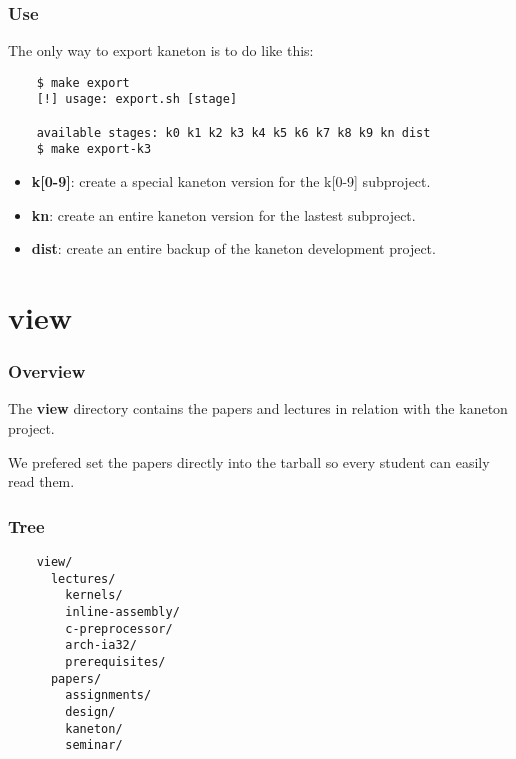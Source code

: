 \begin{frame}[containsverbatim]
  \frametitle{Use}

  The only way to export kaneton is to do like this:

  \begin{verbatim}
    $ make export
    [!] usage: export.sh [stage]

    available stages: k0 k1 k2 k3 k4 k5 k6 k7 k8 k9 kn dist
    $ make export-k3
  \end{verbatim}

  \begin{itemize}
    \item
      \textbf{k[0-9]}: create a special kaneton version for the k[0-9]
      subproject.
    \item
      \textbf{kn}: create an entire kaneton version for the lastest
      subproject.
    \item
      \textbf{dist}: create an entire backup of the kaneton development
      project.
  \end{itemize}
\end{frame}

%
%

\section{view}


\begin{frame}
  \frametitle{Overview}

  The \textbf{view} directory contains the papers and lectures
  in relation with the kaneton project.

  \nl

  We prefered set the papers directly into the tarball so every student
  can easily read them.
\end{frame}


\begin{frame}[containsverbatim]
  \frametitle{Tree}

  \begin{verbatim}
    view/
      lectures/
        kernels/
        inline-assembly/
        c-preprocessor/
        arch-ia32/
        prerequisites/
      papers/
        assignments/
        design/
        kaneton/
        seminar/
  \end{verbatim}
\end{frame}


